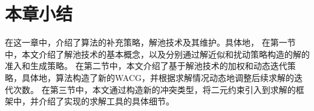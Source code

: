 \section{本章小结}
在这一章中，介绍了算法的补充策略，解池技术及其维护。具体地，
在第一节中，本文介绍了解池技术的基本概念，以及分别通过解近似和扰动策略构造的解的准入和生成策略。
在第二节中，本文介绍了基于解池技术的加权和动态迭代策略，具体地，算法构造了新的WACG，并根据求解情况动态地调整后续求解的迭代次数。
在第三节中，本文通过构造新的冲突类型，将二元约束引入到求解的框架中，并介绍了实现的求解工具的具体细节。